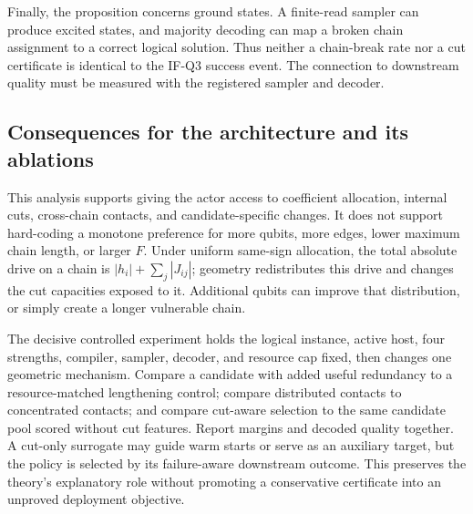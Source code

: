 Finally, the proposition concerns ground states. A finite-read sampler can produce excited states, and majority decoding can map a broken chain assignment to a correct logical solution. Thus neither a chain-break rate nor a cut certificate is identical to the IF-Q3 success event. The connection to downstream quality must be measured with the registered sampler and decoder.

\subsection{Consequences for the architecture and its ablations}
\label{theory:architecture}

This analysis supports giving the actor access to coefficient allocation, internal cuts, cross-chain contacts, and candidate-specific changes. It does not support hard-coding a monotone preference for more qubits, more edges, lower maximum chain length, or larger $F$. Under uniform same-sign allocation, the total absolute drive on a chain is $|h_i|+\sum_j|J_{ij}|$; geometry redistributes this drive and changes the cut capacities exposed to it. Additional qubits can improve that distribution, or simply create a longer vulnerable chain.

The decisive controlled experiment holds the logical instance, active host, four strengths, compiler, sampler, decoder, and resource cap fixed, then changes one geometric mechanism. Compare a candidate with added useful redundancy to a resource-matched lengthening control; compare distributed contacts to concentrated contacts; and compare cut-aware selection to the same candidate pool scored without cut features. Report margins and decoded quality together. A cut-only surrogate may guide warm starts or serve as an auxiliary target, but the policy is selected by its failure-aware downstream outcome. This preserves the theory's explanatory role without promoting a conservative certificate into an unproved deployment objective.
